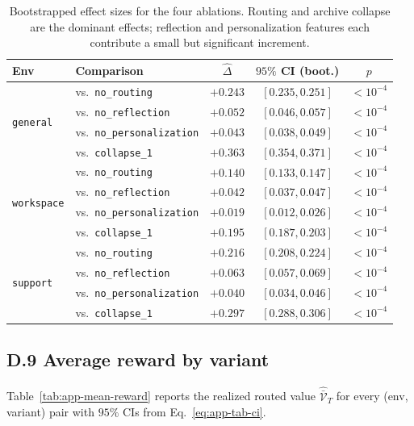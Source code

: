 \documentclass{article} %
\begin{document}
\begin{table}[h]
\centering
\small
\begin{tabular}{llccc}
\toprule
Env & Comparison & $\widehat\Delta$ & $95\%$ CI (boot.) & $p$ \\
\midrule
\multirow{4}{*}{\texttt{general}}
 & vs.\ \texttt{no\_routing}         & $+0.243$ & $[0.235, 0.251]$ & $<10^{-4}$ \\
 & vs.\ \texttt{no\_reflection}      & $+0.052$ & $[0.046, 0.057]$ & $<10^{-4}$ \\
 & vs.\ \texttt{no\_personalization} & $+0.043$ & $[0.038, 0.049]$ & $<10^{-4}$ \\
 & vs.\ \texttt{collapse\_1}         & $+0.363$ & $[0.354, 0.371]$ & $<10^{-4}$ \\
\midrule
\multirow{4}{*}{\texttt{workspace}}
 & vs.\ \texttt{no\_routing}         & $+0.140$ & $[0.133, 0.147]$ & $<10^{-4}$ \\
 & vs.\ \texttt{no\_reflection}      & $+0.042$ & $[0.037, 0.047]$ & $<10^{-4}$ \\
 & vs.\ \texttt{no\_personalization} & $+0.019$ & $[0.012, 0.026]$ & $<10^{-4}$ \\
 & vs.\ \texttt{collapse\_1}         & $+0.195$ & $[0.187, 0.203]$ & $<10^{-4}$ \\
\midrule
\multirow{4}{*}{\texttt{support}}
 & vs.\ \texttt{no\_routing}         & $+0.216$ & $[0.208, 0.224]$ & $<10^{-4}$ \\
 & vs.\ \texttt{no\_reflection}      & $+0.063$ & $[0.057, 0.069]$ & $<10^{-4}$ \\
 & vs.\ \texttt{no\_personalization} & $+0.040$ & $[0.034, 0.046]$ & $<10^{-4}$ \\
 & vs.\ \texttt{collapse\_1}         & $+0.297$ & $[0.288, 0.306]$ & $<10^{-4}$ \\
\bottomrule
\end{tabular}
\caption{Bootstrapped effect sizes for the four ablations. Routing and archive collapse are the dominant effects; reflection and personalization features each contribute a small but significant increment.}
\label{tab:app-bootstrap}
\end{table}

\subsection{D.9 Average reward by variant}

\label{app:tab-reward}

Table~\ref{tab:app-mean-reward} reports the realized routed value $\widehat{\bar{\mathcal V}}_T$ for every (env, variant) pair with $95\%$ CIs from Eq.~\eqref{eq:app-tab-ci}.
\end{document}
